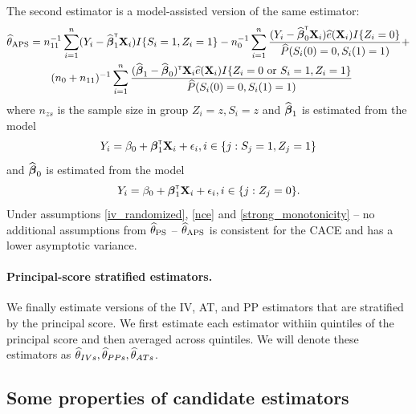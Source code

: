\documentclass{article}
\def\siv{_{\text{IV}}}
\def\sps{_{\text{PS}}}
\def\saps{_{\text{APS}}}
\begin{document}
The second estimator is a model-assisted version of the same estimator:
\begin{align}
    \thetahat\saps &= n_{11}\inv\sumin (Y_i - \bbetahat_1\trans\bX_i)I\{S_i = 1, Z_i = 1\} - n_{0}\inv\sumin \frac{(Y_i - \bbetahat_0\trans\bX_i)\ehat(\bX_i)I\{Z_i = 0\}}{\Phat(S_i(0) = 0, S_i(1) = 1)} +\\
    &\qquad (n_0 + n_{11})\inv\sumin \frac{(\bbetahat_1 - \bbetahat_0)\trans\bX_i\ehat(\bX_i)I\{Z_i = 0 \text{ or } S_i = 1, Z_i = 1\}}{\Phat(S_i(0) = 0, S_i(1) = 1)}
\end{align}
where $n_{zs}$ is the sample size in group $Z_i = z, S_i = z$ and ${\widehat{\boldsymbol{\beta}}}_1$ is estimated from the model
\[
Y_i = \beta_0 + \boldsymbol{\beta}_1^{{\sf \scriptscriptstyle{T}}}{\bf X}_i + \epsilon_i, i \in \{j : S_j = 1, Z_j = 1\}
\]
and ${\widehat{\boldsymbol{\beta}}}_0$ is estimated from the model
\[
Y_i = \beta_0 + \boldsymbol{\beta}_1^{{\sf \scriptscriptstyle{T}}}{\bf X}_i + \epsilon_i, i \in \{j : Z_j = 0\}.
\]
Under assumptions \ref{iv_randomized}, \ref{nce} and \ref{strong_monotonicity} -- no additional assumptions from $\thetahat\sps$ -- $\thetahat\saps$ is consistent for the CACE and has a lower asymptotic variance.
\paragraph{Principal-score stratified estimators.} We finally estimate versions of the IV, AT, and PP estimators that are stratified by the principal score. We first estimate each estimator withiin quintiles of the principal score and then averaged across quintiles. We will denote these estimators as ${\widehat\theta}_{IVs}, {\widehat\theta}_{PPs}, {\widehat\theta}_{ATs}$. 

\subsection{Some properties of candidate estimators}



\end{document}
